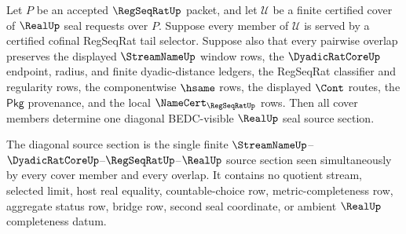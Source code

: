 \begin{theorem}
\label{thm:regseqrat-tail-selector-diagonal-cover-source-coherence}
Let $P$ be an accepted $\RegSeqRatUp$ packet, and let $\mathcal U$ be a finite
certified cover of $\RealUp$ seal requests over $P$. Suppose every member of
$\mathcal U$ is served by a certified cofinal RegSeqRat tail selector. Suppose
also that every pairwise overlap preserves the displayed $\StreamNameUp$
window rows, the $\DyadicRatCoreUp$ endpoint, radius, and finite
dyadic-distance ledgers, the RegSeqRat classifier and regularity rows, the
componentwise $\hsame$ rows, the displayed $\Cont$ routes, the
$\mathsf{Pkg}$ provenance, and the local $\NameCert_{\RegSeqRatUp}$ rows.
Then all cover members determine one diagonal BEDC-visible $\RealUp$ seal
source section.

The diagonal source section is the single finite
$\StreamNameUp$--$\DyadicRatCoreUp$--$\RegSeqRatUp$--$\RealUp$ source section
seen simultaneously by every cover member and every overlap. It contains no
quotient stream, selected limit, host real equality, countable-choice row,
metric-completeness row, aggregate status row, bridge row, second seal
coordinate, or ambient $\RealUp$ completeness datum.
\end{theorem}
